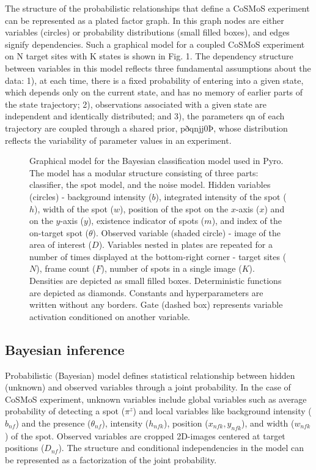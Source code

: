 The structure of the probabilistic relationships that define a CoSMoS experiment can be represented as a plated factor graph. In this graph nodes are either variables (circles) or probability distributions (small filled boxes), and edges signify dependencies. Such a graphical model for a coupled CoSMoS experiment on N target sites with K states is shown in Fig. 1. The dependency structure between
variables in this model reflects three fundamental assumptions about the
data: 1), at each time, there is a fixed probability of entering into a given
state, which depends only on the current state, and has no memory of earlier
parts of the state trajectory; 2), observations associated with a given state
are independent and identically distributed; and 3), the parameters qn of
each trajectory are coupled through a shared prior, pðqnjj0Þ, whose distribution reflects the variability of parameter values in an experiment.

\begin{figure}[ht]
  \begin{center}
    
  \end{center}
  \caption{Graphical model for the Bayesian classification model used in Pyro. The model has a modular structure consisting of three parts: classifier, the spot model, and the noise model. Hidden variables (circles) - background intensity ($b$), integrated intensity of the spot ($h$), width of the spot ($w$), position of the spot on the $x$-axis ($x$) and on the $y$-axis ($y$), existence indicator of spots ($m$), and index of the on-target spot ($\theta$). Observed variable (shaded circle) - image of the area of interest ($D$). Variables nested in plates are repeated for a number of times displayed at the bottom-right corner - target sites ($N$), frame count ($F$), number of spots in a single image ($K$). Densities are depicted as  small filled boxes. Deterministic functions are depicted as diamonds. Constants and hyperparameters are written without any borders. Gate (dashed box) represents variable activation conditioned on another variable.}
  \label{fig:graph}
\end{figure}

\subsection{Bayesian inference}

Probabilistic (Bayesian) model defines statistical relationship between hidden (unknown) and observed variables through a joint probability. In the case of CoSMoS experiment, unknown variables include global variables such as average probability of detecting a spot ($\pi^z$) and local variables like background intensity ($b_{nf}$) and the presence ($\theta_{nf}$), intensity ($h_{nfk}$), position ($x_{nfk}, y_{nfk}$), and width ($w_{nfk}$) of the spot. Observed variables are cropped 2D-images centered at target positions ($D_{nf}$). The structure and conditional independencies in the model can be represented as a factorization of the joint probability.

